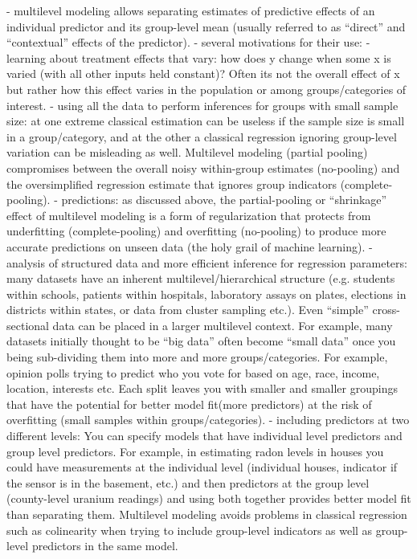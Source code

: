 - multilevel modeling allows separating estimates of predictive effects of an individual predictor and its group-level mean (usually referred to as “direct” and “contextual” effects of the predictor).
- several motivations for their use:
- learning about treatment effects that vary: how does y change when some x is varied (with all other inputs held constant)? Often its not the overall effect of x but rather how this effect varies in the population or among groups/categories of interest.
- using all the data to perform inferences for groups with small sample size: at one extreme classical estimation can be useless if the sample size is small in a group/category, and at the other a classical regression ignoring group-level variation can be misleading as well. Multilevel modeling (partial pooling) compromises between the overall noisy within-group estimates (no-pooling) and the oversimplified regression estimate that ignores group indicators (complete-pooling).
- predictions: as discussed above, the partial-pooling or “shrinkage” effect of multilevel modeling is a form of regularization that protects from underfitting (complete-pooling) and overfitting (no-pooling) to produce more accurate predictions on unseen data (the holy grail of machine learning).
- analysis of structured data and more efficient inference for regression parameters: many datasets have an inherent multilevel/hierarchical structure (e.g. students within schools, patients within hospitals, laboratory assays on plates, elections in districts within states, or data from cluster sampling etc.). Even “simple” cross-sectional data can be placed in a larger multilevel context. For example, many datasets initially thought to be “big data” often become “small data” once you being sub-dividing them into more and more groups/categories. For example, opinion polls trying to predict who you vote for based on age, race, income, location, interests etc. Each split leaves you with smaller and smaller groupings that have the potential for better model fit(more predictors) at the risk of overfitting (small samples within groups/categories).
- including predictors at two different levels: You can specify models that have individual level predictors and group level predictors. For example, in estimating radon levels in houses you could have measurements at the individual level (individual houses, indicator if the sensor is in the basement, etc.) and then predictors at the group level (county-level uranium readings) and using both together provides better model fit than separating them. Multilevel modeling avoids problems in classical regression such as colinearity when trying to include group-level indicators as well as group-level predictors in the same model.
